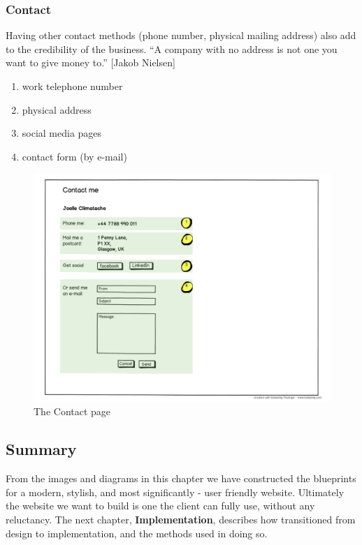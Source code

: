 \documentclass{l3proj}
\begin{document}
\subsubsection{Contact}
Having other contact methods (phone number, physical mailing address) also add
to the credibility of the business. ``A company with no address is not one you
want to give money to.'' [Jakob Nielsen]
\begin{enumerate} \itemsep1pt \parskip0pt 
	\item work telephone number
	\item physical address
	\item social media pages
	\item contact form (by e-mail)
\end{enumerate}

\begin{figure}
\label{wireframes:contact}
\begin{center}
\includegraphics[width=\linewidth, trim = 0px 40px 0px 220px]
	{wireframes/contact}
\caption{The Contact page}
\end{center}
\end{figure}

\subsection{Summary}
From the images and diagrams in this chapter we have constructed the blueprints for a modern, stylish, and most significantly - user friendly website. Ultimately the website we want to build is one the client can fully use, without any reluctancy. The next chapter, \textbf{Implementation}, describes how transitioned from design to implementation, and the methods used in doing so.
\end{document}
